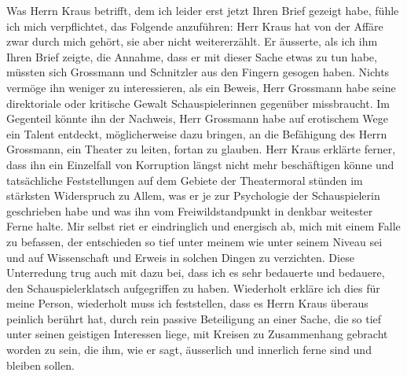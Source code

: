 \pstart
           Was Herrn Kraus betrifft, dem ich leider erst
               jetzt Ihren Brief gezeigt habe, fühle ich mich verpflichtet, das Folgende anzuführen:
               Herr Kraus hat von der Affäre zwar durch mich
               gehört, sie aber nicht weitererzählt. Er äusserte, als ich ihm Ihren Brief zeigte,
               die Annahme, dass er mit dieser Sache etwas zu tun habe, müssten sich Grossmann und Schnitzler aus den Fingern
               gesogen haben. Nichts vermöge ihn weniger zu interessieren, als ein Beweis, Herr Grossmann habe seine direktoriale oder
               kritische Gewalt Schauspielerinnen gegenüber missbraucht. Im Gegenteil könnte ihn der
               Nachweis, Herr Grossmann habe auf erotischem
               Wege ein Talent entdeckt, möglicherweise dazu bringen, an die Befähigung des Herrn
                  Grossmann, ein Theater zu leiten, fortan zu
               glauben. Herr Kraus erklärte ferner, dass ihn
               ein Einzelfall von Korruption längst nicht mehr beschäftigen könne und tatsäch{\pb}liche Feststellungen auf dem Gebiete der Theatermoral
               stünden im stärksten Widerspruch zu Allem, was er je zur Psychologie der
               Schauspielerin geschrieben habe und was ihn vom Freiwildstandpunkt in denkbar
               weitester Ferne halte. Mir selbst riet er eindringlich und energisch ab, mich mit
               einem Falle zu befassen, der entschieden so tief unter meinem wie unter seinem Niveau
               sei und auf Wissenschaft und Erweis in solchen Dingen zu verzichten. Diese
               Unterredung trug auch mit dazu bei, dass ich es sehr bedauerte und bedauere, den
               Schauspielerklatsch aufgegriffen zu haben. Wiederholt erkläre ich dies für meine
               Person, wiederholt muss ich feststellen, dass es Herrn Kraus überaus peinlich berührt hat, durch rein passive
               Beteiligung an einer Sache, die so tief unter seinen geistigen Interessen liege, mit
               Kreisen zu Zusammenhang gebracht worden zu sein, die ihm, wie er sagt, äusserlich und
               innerlich ferne sind und bleiben sollen.\pend
           
